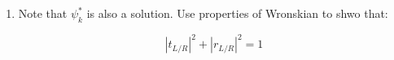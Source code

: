 \begin{mystexercise}
\begin{enumerate}
Similarily, for $\Pi_2$, $k<0$:

\begin{equation}
\psi_k^R(x)=\begin{cases}
t_R(k)\exp(ikx)& x\in L \\
\exp(ikx) + r_R(k)\exp(-ikx) & x\in R
\end{cases}
\end{equation}


where $t, r$ denotes the \textit{transmission} and \textit{reflection} coefficient.


\item Note that $\psi_k^*$ is also a solution. Use properties of Wronskian to shwo that:

\begin{equation}
|t_{L/R}|^2 + |r_{L/R}|^2=1
\end{equation}
\end{enumerate}

\end{mystexercise}
